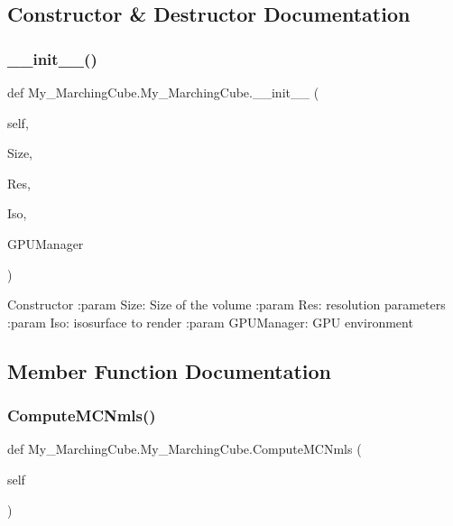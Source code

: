 

\subsection{Constructor \& Destructor Documentation}
\mbox{\label{class_my___marching_cube_1_1_my___marching_cube_a7f2970f295285729918604008fc7809f}} 
\subsubsection{\+\_\+\+\_\+init\+\_\+\+\_\+()}
{\footnotesize\ttfamily def My\+\_\+\+Marching\+Cube.\+My\+\_\+\+Marching\+Cube.\+\_\+\+\_\+init\+\_\+\+\_\+ (\begin{DoxyParamCaption}\item[{}]{self,  }\item[{}]{Size,  }\item[{}]{Res,  }\item[{}]{Iso,  }\item[{}]{G\+P\+U\+Manager }\end{DoxyParamCaption})}

\begin{DoxyVerb}Constructor
:param Size: Size of the volume
:param Res: resolution parameters
:param Iso: isosurface to render
:param GPUManager: GPU environment
\end{DoxyVerb}
 

\subsection{Member Function Documentation}
\mbox{\label{class_my___marching_cube_1_1_my___marching_cube_a5a1e9c085022497596ba726002435603}} 
\subsubsection{Compute\+M\+C\+Nmls()}
{\footnotesize\ttfamily def My\+\_\+\+Marching\+Cube.\+My\+\_\+\+Marching\+Cube.\+Compute\+M\+C\+Nmls (\begin{DoxyParamCaption}\item[{}]{self }\end{DoxyParamCaption})}

